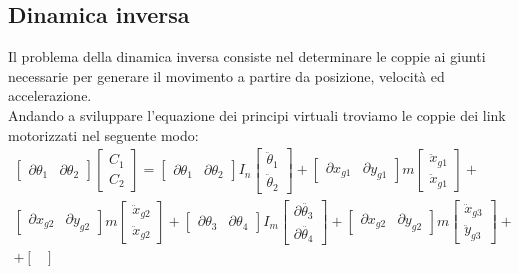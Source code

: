 \subsection{Dinamica inversa}
Il problema della dinamica inversa consiste nel determinare le coppie ai giunti necessarie per generare il movimento a partire da posizione, velocità ed accelerazione.
\\Andando a sviluppare l'equazione dei principi virtuali troviamo le coppie dei link motorizzati nel seguente modo:
\begin{equation}
\begin{split}
\begin{bmatrix}
\partial \theta_1 & \partial \theta_2
\end{bmatrix}
\begin{bmatrix}
C_1 \\ C_2
\end{bmatrix} 
= \begin{bmatrix}
\partial \theta_1 & \partial \theta_2
\end{bmatrix} I_n \begin{bmatrix}
\ddot{\theta}_1 \\ \ddot{\theta}_2
\end{bmatrix}+ \begin{bmatrix}
\partial x_{g1} & \partial y_{g1}
\end{bmatrix}m\begin{bmatrix}
\ddot{x}_{g1} \\ \ddot{x}_{g1}
\end{bmatrix} +
\\ \begin{bmatrix} \partial x_{g2} & \partial y_{g2}
\end{bmatrix}m\begin{bmatrix}
\ddot{x}_{g2} \\ \ddot{x}_{g2}
\end{bmatrix} +
\begin{bmatrix}
\partial \theta_3 & \partial \theta_4
\end{bmatrix}I_m \begin{bmatrix}
\partial \ddot{\theta_3} \\ \partial\ddot{\theta_4}
\end{bmatrix}+\begin{bmatrix}
\partial x_{g2} & \partial y_{g2}
\end{bmatrix} m \begin{bmatrix}
\ddot{x}_{g3} \\ \ddot{y}_{g3}
\end{bmatrix}+\\+\begin{bmatrix}

\end{bmatrix}
\end{split}
\end{equation}
